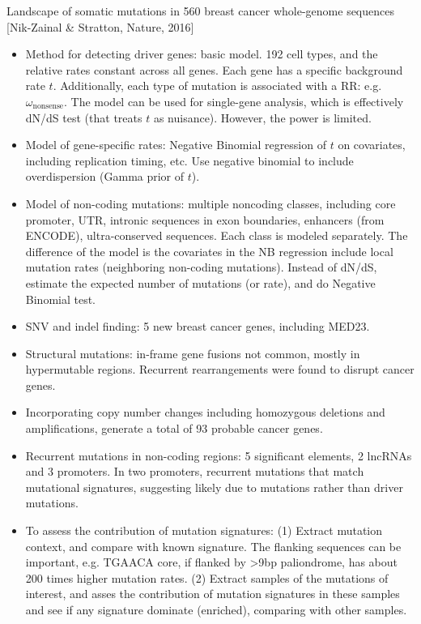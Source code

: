 \documentclass{report}
\begin{document}
Landscape of somatic mutations in 560 breast cancer whole-genome sequences [Nik-Zainal \& Stratton, Nature, 2016]
\begin{itemize}
	
	\item Method for detecting driver genes: basic model. 192 cell types, and the relative rates constant across all genes. Each gene has a specific background rate $t$. Additionally, each type of mutation is associated with a RR: e.g. $\omega_{\text{nonsense}}$. The model can be used for single-gene analysis, which is effectively dN/dS test (that treats $t$ as nuisance). However, the power is limited.
	
	\item Model of gene-specific rates: Negative Binomial regression of $t$ on covariates, including replication timing, etc. Use negative binomial to include overdispersion (Gamma prior of $t$).
	
	\item Model of non-coding mutations: multiple noncoding classes, including core promoter, UTR, intronic sequences in exon boundaries, enhancers (from ENCODE), ultra-conserved sequences. Each class is modeled separately. The difference of the model is the covariates in the NB regression include local mutation rates (neighboring non-coding mutations). Instead of dN/dS, estimate the expected number of mutations (or rate), and do Negative Binomial test.
	
	\item SNV and indel finding: 5 new breast cancer genes, including MED23.
	
	\item Structural mutations: in-frame gene fusions not common, mostly in hypermutable regions. Recurrent rearrangements were found to disrupt cancer genes.
	
	\item Incorporating copy number changes including homozygous deletions and amplifications, generate a total of 93 probable cancer genes.
	
	\item Recurrent mutations in non-coding regions: 5 significant elements, 2 lncRNAs and 3 promoters. In two promoters, recurrent mutations that match mutational signatures, suggesting likely due to mutations rather than driver mutations.
	
	\item To assess the contribution of mutation signatures: (1) Extract mutation context, and compare with known signature. The flanking sequences can be important, e.g. TGAACA core, if flanked by >9bp paliondrome, has about 200 times higher mutation rates. (2) Extract samples of the mutations of interest, and asses the contribution of mutation signatures in these samples and see if any signature dominate (enriched), comparing with other samples.
	

\end{itemize}
\end{document}
